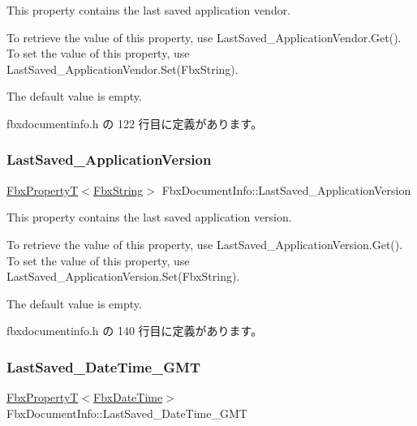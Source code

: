 This property contains the last saved application vendor.

To retrieve the value of this property, use Last\+Saved\+\_\+\+Application\+Vendor.\+Get(). To set the value of this property, use Last\+Saved\+\_\+\+Application\+Vendor.\+Set(\+Fbx\+String).

The default value is empty. 

 fbxdocumentinfo.\+h の 122 行目に定義があります。

\mbox{\label{class_fbx_document_info_a5cffe99a205491edc2a53cf4dfe6d7ff}} 
\subsubsection{\texorpdfstring{Last\+Saved\+\_\+\+Application\+Version}{LastSaved\_ApplicationVersion}}
{\footnotesize\ttfamily \hyperlink{class_fbx_property_t}{Fbx\+PropertyT}$<$\hyperlink{class_fbx_string}{Fbx\+String}$>$ Fbx\+Document\+Info\+::\+Last\+Saved\+\_\+\+Application\+Version}

This property contains the last saved application version.

To retrieve the value of this property, use Last\+Saved\+\_\+\+Application\+Version.\+Get(). To set the value of this property, use Last\+Saved\+\_\+\+Application\+Version.\+Set(\+Fbx\+String).

The default value is empty. 

 fbxdocumentinfo.\+h の 140 行目に定義があります。

\mbox{\label{class_fbx_document_info_a46e21e243dfdbfed83cac11774671ac4}} 
\subsubsection{\texorpdfstring{Last\+Saved\+\_\+\+Date\+Time\+\_\+\+G\+MT}{LastSaved\_DateTime\_GMT}}
{\footnotesize\ttfamily \hyperlink{class_fbx_property_t}{Fbx\+PropertyT}$<$\hyperlink{class_fbx_date_time}{Fbx\+Date\+Time}$>$ Fbx\+Document\+Info\+::\+Last\+Saved\+\_\+\+Date\+Time\+\_\+\+G\+MT}

